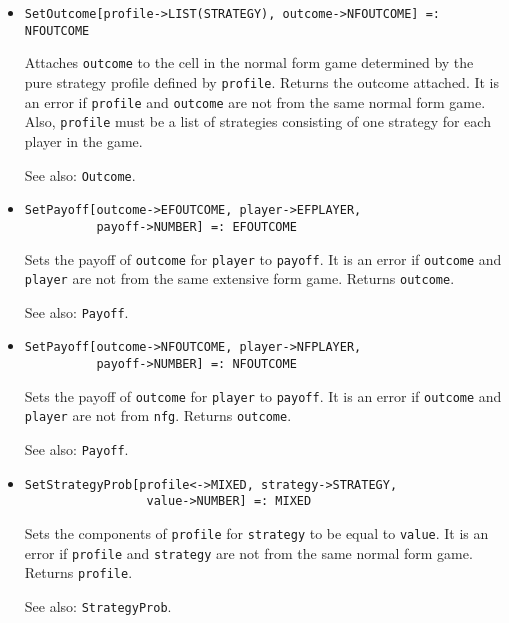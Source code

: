 \begin{itemize}
\item{}
\protect \large \begin{verbatim} 
SetOutcome[profile->LIST(STRATEGY), outcome->NFOUTCOME] =: NFOUTCOME 
\end{verbatim}\normalsize

\bd 
Attaches \verb+outcome+ to the cell in the normal form game
determined by the pure strategy profile defined by \verb+profile+.
Returns the outcome attached.  It is an error if \verb+profile+ and
\verb+outcome+ are not from the same normal form game. Also,
\verb+profile+ must be a list of strategies consisting of one strategy
for each player in the game.  
\item [See also:] \verb+Outcome+.
\ed

\item{}
\protect \large \begin{verbatim}
SetPayoff[outcome->EFOUTCOME, player->EFPLAYER,
          payoff->NUMBER] =: EFOUTCOME 
\end{verbatim}\normalsize

\bd
Sets the payoff of \verb+outcome+ for \verb+player+ to \verb+payoff+.
It is an error if \verb+outcome+ and \verb+player+ are not from the
same extensive form game.  Returns \verb+outcome+.
\item [See also:] \verb+Payoff+.
\ed

\item{}
\protect \large \begin{verbatim}
SetPayoff[outcome->NFOUTCOME, player->NFPLAYER, 
          payoff->NUMBER] =: NFOUTCOME 
\end{verbatim}\normalsize

\bd
Sets the payoff of \verb+outcome+ for \verb+player+ to \verb+payoff+.
It is an error if \verb+outcome+ and \verb+player+ are not from \verb+nfg+.
Returns \verb+outcome+.
\item [See also:] \verb+Payoff+.
\ed

\item{} 
\protect \large \begin{verbatim}
SetStrategyProb[profile<->MIXED, strategy->STRATEGY, 
                 value->NUMBER] =: MIXED 
\end{verbatim} \normalsize

\bd
Sets the components of \verb+profile+ for \verb+strategy+ to be equal
to \verb+value+.  It is an error if \verb+profile+ and \verb+strategy+
are not from the same normal form game.  Returns \verb+profile+.
\item [See also:] \verb+StrategyProb+.
\ed


\end{itemize}
